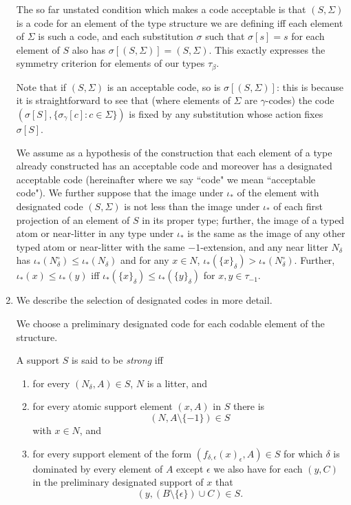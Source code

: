 \documentclass[12pt]{article}
\begin{document}
\begin{enumerate}
\begin{enumerate}
\end{enumerate}

The so far unstated condition which makes a code acceptable is that $(S,\Sigma)$ is a code for an element of the type structure we are defining iff each element of $\Sigma$ is such a code, and each substitution $\sigma$ such that
$\sigma[s]=s$ for each element of $S$ also has $\sigma[(S,\Sigma)] = (S,\Sigma)$.  This exactly expresses the symmetry criterion for elements of our types $\tau_\beta$.

Note that if $(S,\Sigma)$ is an acceptable code, so is $\sigma[(S,\Sigma)]$:  this is because it is straightforward to see that (where elements of $\Sigma$ are $\gamma$-codes) the code $(\sigma[S],\{\sigma_\gamma[c]:c \in \Sigma\})$ is fixed by any substitution whose action  fixes $\sigma[S]$.

We assume as a hypothesis of the construction that each element of a type already constructed has an acceptable code and moreover has a designated acceptable code (hereinafter where we say ``code" we mean ``acceptable code").  We further suppose that the image under $\iota_*$ of the element with designated code $(S,\Sigma)$
is not less than the image under $\iota_*$  of each first projection of an element of $S$ in its proper type;  further, the image of a typed atom or near-litter in any type under $\iota_*$ is the same as the image of any other typed atom or near-litter with the same $-1$-extension, and any
near litter $N_\delta$ has $\iota_*(N^{\circ}_\delta) \leq \iota_*(N_\delta)$ and for any $x \in N$, $\iota_*(\{x\}_\delta) > \iota_*(N^\circ_\delta)$.  Further, $\iota_*(x) \leq \iota_*(y)$ iff $\iota_*(\{x\}_\delta) \leq \iota_*(\{y\}_\delta)$ for $x,y \in \tau_{-1}$.

\item We describe the selection of designated codes in more detail.

We choose a preliminary designated code for each codable element of the structure.

A support $S$ is said to be {\em strong\/} iff

\begin{enumerate}

\item for every $(N_\delta,A) \in S$, $N$ is a litter, and
\item  for every atomic support element $(x,A)$ in $S$ there is $$(N,A\setminus\{-1\}) \in S$$ with $x \in N$, and 

\item for every support element of the form $(f_{\delta,\epsilon}(x)_\epsilon,A) \in S$ for which $\delta$ is dominated by every element of $A$ except $\epsilon$ we also have for each $(y,C)$ in the preliminary designated support
of $x$ that $$(y,(B \setminus \{\epsilon\})\cup C)\in S.$$


\end{enumerate}
\end{enumerate}
\end{document}
